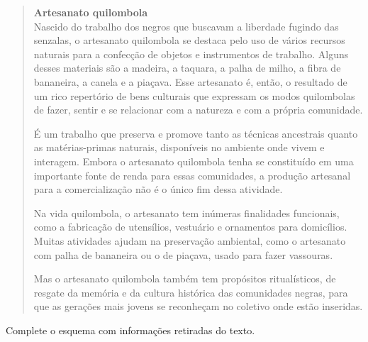 \begin{quote}
\textbf{Artesanato quilombola}\\
Nascido do trabalho dos negros que buscavam a liberdade fugindo das
senzalas, o artesanato quilombola se destaca pelo uso de vários recursos
naturais para a confecção de objetos e instrumentos de trabalho. Alguns
desses materiais são a madeira, a taquara, a palha de milho, a fibra de
bananeira, a canela e a piaçava. Esse artesanato é, então, o resultado
de um rico repertório de bens culturais que expressam os modos
quilombolas de fazer, sentir e se relacionar com a natureza e com a
própria comunidade.

É um trabalho que preserva e promove tanto as técnicas ancestrais quanto
as matérias-primas naturais, disponíveis no ambiente onde vivem e
interagem. Embora o artesanato quilombola tenha se constituído em uma
importante fonte de renda para essas comunidades, a produção artesanal
para a comercialização não é o único fim dessa atividade.

Na vida quilombola, o artesanato tem inúmeras finalidades funcionais,
como a fabricação de utensílios, vestuário e ornamentos para domicílios.
Muitas atividades ajudam na preservação ambiental, como o artesanato com
palha de bananeira ou o de piaçava, usado para fazer vassouras.

Mas o artesanato quilombola também tem propósitos ritualísticos, de
resgate da memória e da cultura histórica das comunidades negras, para
que as gerações mais jovens se reconheçam no coletivo onde estão
inseridas.

\end{quote}

Complete o esquema com informações retiradas do texto.

